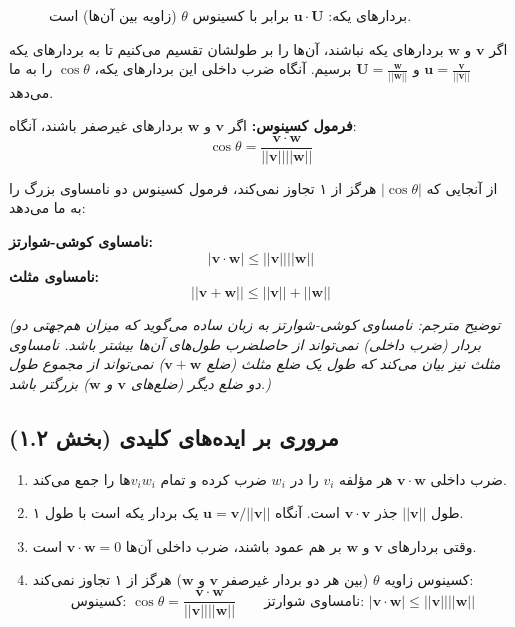 \documentclass[12pt, a4paper]{book}
\begin{document}
	\begin{figure}[h!]
		\centering
		\caption{بردارهای یکه: $\mathbf{u} \cdot \mathbf{U}$ برابر با کسینوس $\theta$ (زاویه بین آن‌ها) است.}
	\end{figure}
	
	اگر $\mathbf{v}$ و $\mathbf{w}$ بردارهای یکه نباشند، آن‌ها را بر طولشان تقسیم می‌کنیم تا به بردارهای یکه $\mathbf{u}=\frac{\mathbf{v}}{||\mathbf{v}||}$ و $\mathbf{U}=\frac{\mathbf{w}}{||\mathbf{w}||}$ برسیم. آنگاه ضرب داخلی این بردارهای یکه، $\cos\theta$ را به ما می‌دهد.
	
	\begin{framed}
		\textbf{فرمول کسینوس:} اگر $\mathbf{v}$ و $\mathbf{w}$ بردارهای غیرصفر باشند، آنگاه:
		\[ \cos\theta = \frac{\mathbf{v} \cdot \mathbf{w}}{||\mathbf{v}|| ||\mathbf{w}||} \]
	\end{framed}
	
	از آنجایی که $|\cos\theta|$ هرگز از ۱ تجاوز نمی‌کند، فرمول کسینوس دو نامساوی بزرگ را به ما می‌دهد:
	
	\begin{framed}
		\textbf{نامساوی کوشی-شوارتز:}
		\[ |\mathbf{v} \cdot \mathbf{w}| \le ||\mathbf{v}|| ||\mathbf{w}|| \]
		\textbf{نامساوی مثلث:}
		\[ ||\mathbf{v} + \mathbf{w}|| \le ||\mathbf{v}|| + ||\mathbf{w}|| \]
	\end{framed}
	\textit{(توضیح مترجم: نامساوی کوشی-شوارتز به زبان ساده می‌گوید که میزان هم‌جهتی دو بردار (ضرب داخلی) نمی‌تواند از حاصلضرب طول‌های آن‌ها بیشتر باشد. نامساوی مثلث نیز بیان می‌کند که طول یک ضلع مثلث (ضلع $\mathbf{v}+\mathbf{w}$) نمی‌تواند از مجموع طول دو ضلع دیگر (ضلع‌های $\mathbf{v}$ و $\mathbf{w}$) بزرگتر باشد.)}
	
	\newpage
	\subsection*{مروری بر ایده‌های کلیدی (بخش ۱.۲)}
	\begin{enumerate}
		\item ضرب داخلی $\mathbf{v} \cdot \mathbf{w}$ هر مؤلفه $v_i$ را در $w_i$ ضرب کرده و تمام $v_iw_i$ها را جمع می‌کند.
		\item طول $||\mathbf{v}||$ جذر $\mathbf{v} \cdot \mathbf{v}$ است. آنگاه $\mathbf{u} = \mathbf{v} / ||\mathbf{v}||$ یک بردار یکه است با طول ۱.
		\item وقتی بردارهای $\mathbf{v}$ و $\mathbf{w}$ بر هم عمود باشند، ضرب داخلی آن‌ها $\mathbf{v} \cdot \mathbf{w}=0$ است.
		\item کسینوس زاویه $\theta$ (بین هر دو بردار غیرصفر $\mathbf{v}$ و $\mathbf{w}$) هرگز از ۱ تجاوز نمی‌کند:
		\[ \text{کسینوس: } \cos\theta = \frac{\mathbf{v} \cdot \mathbf{w}}{||\mathbf{v}|| ||\mathbf{w}||} \quad \quad \text{نامساوی شوارتز: } |\mathbf{v} \cdot \mathbf{w}| \le ||\mathbf{v}|| ||\mathbf{w}|| \]
	\end{enumerate}
	
\end{document}
